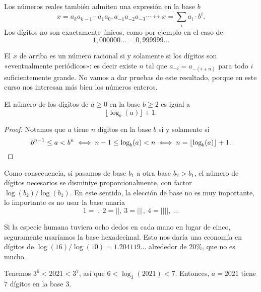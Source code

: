 \begin{comentario}
  Los números reales también admiten una expresión en la base $b$
  \[
    x = a_k a_{k-1} \cdots a_1 a_0, a_{-1} a_{-2} a_{-3} \cdots
    \longleftrightarrow
    x = \sum_i a_i\cdot b^i.
  \]
  Los dígitos no son exactamente únicos, como por ejemplo en el caso de
  $$1,000000\ldots = 0,999999\ldots$$

  El $x$ de arriba es un número racional si y solamente si los dígitos son
  «eventualmente periódicos»: es decir existe $n$ tal que $a_{-i} = a_{-(i+n)}$
  para todo $i$ suficientemente grande. No vamos a dar pruebas de este
  resultado, porque en este curso nos interesan más bien los números enteros.
\end{comentario}

\begin{proposicion}
  El número de los dígitos de $a \ge 0$ en la base $b \ge 2$ es igual a
  $$\lfloor\log_b (a)\rfloor + 1.$$

  \begin{proof}
    Notamos que $a$ tiene $n$ dígitos en la base $b$ si y solamente si
    \[
      b^{n-1} \le a < b^n
      \iff
      n-1 \le \log_b (a) < n
      \iff
      n = \lfloor\log_b (a)\rfloor + 1.
      \qedhere
    \]
  \end{proof}
\end{proposicion}

Como consecuencia, si pasamos de base $b_1$ a otra base $b_2 > b_1$, el número
de dígitos necesarios se disminiye proporcionalmente, con factor
$\log (b_2) / \log (b_1)$. En este sentido, la elección de base no es muy
importante, lo importante es no usar la base unaria
\[ 1 = |, ~ 2 = ||, ~ 3 = |||, ~ 4 = ||||, ~ \ldots \]

\begin{ejemplo}
  Si la especie humana tuviera ocho dedos en cada mano en lugar de cinco,
  seguramente usaríamos la base hexadecimal. Esto nos daría una economía en
  dígitos de $\log(16)/\log(10) = 1.204119\ldots$ alrededor de $20\%$, que no es
  mucho.
\end{ejemplo}

\begin{ejemplo}
  Tenemos $3^6 < 2021 < 3^7$, así que $6 < \log_3 (2021) < 7$. Entonces,
  $a = 2021$ tiene $7$ dígitos en la base $3$.
\end{ejemplo}

